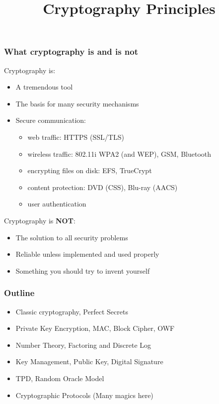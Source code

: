 

\title{Cryptography Principles}


\maketitle
\begin{frame}\frametitle{What cryptography is and is not}
Cryptography is:
\begin{itemize}
\item A tremendous tool
\item The basis for many security mechanisms
\item Secure communication: 
\begin{itemize}
\item web traffic: HTTPS (SSL/TLS)
\item wireless traffic: 802.11i WPA2 (and WEP), GSM, Bluetooth
\item encrypting files on disk: EFS, TrueCrypt
\item content protection: DVD (CSS), Blu-ray (AACS)
\item user authentication
\end{itemize}
\end{itemize}
Cryptography is \textbf{NOT}:
\begin{itemize}
\item The solution to all security problems
\item Reliable unless implemented and used properly
\item Something you should try to invent yourself	
\end{itemize}
\end{frame}
\begin{frame}\frametitle{Outline}
\begin{itemize}
\item Classic cryptography, Perfect Secrets
\item Private Key Encryption, MAC, Block Cipher, OWF
\item Number Theory, Factoring and Discrete Log
\item Key Management, Public Key, Digital Signature
\item TPD, Random Oracle Model
\item Cryptographic Protocols (Many magics here)
\end{itemize}
\end{frame}

